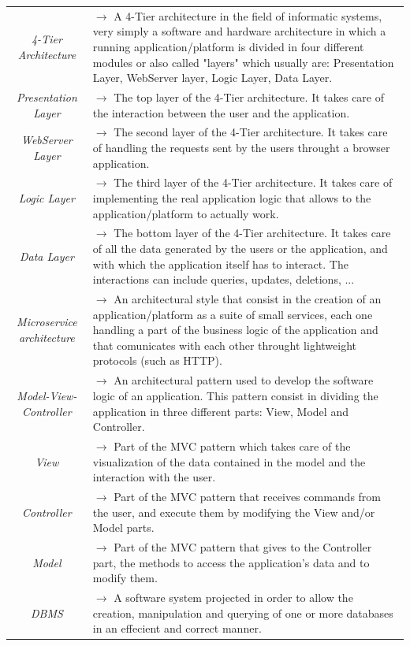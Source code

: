 \documentclass{article}
\begin{document}
{\begin{xltabular}{\textwidth}{ >{\raggedright\arraybackslash}c >{\raggedright\arraybackslash}X }
    \textit{4-Tier Architecture} & $\rightarrow$ A 4-Tier architecture in the field of informatic systems, very simply
    a software and hardware architecture in which a running application/platform is divided in four different modules
    or also called "layers" which usually are: Presentation Layer, WebServer layer, Logic Layer, Data Layer. \\
    \textit{Presentation Layer} & $\rightarrow$ The top layer of the 4-Tier architecture. It takes care of the interaction
    between the user and the application.\\
    \textit{WebServer Layer} & $\rightarrow$ The second layer of the 4-Tier architecture. It takes care of handling the requests
    sent by the users throught a browser application. \\
    \textit{Logic Layer} & $\rightarrow$ The third layer of the 4-Tier architecture. It takes care of implementing the real
    application logic that allows to the application/platform to actually work. \\
    \textit{Data Layer} & $\rightarrow$ The bottom layer of the 4-Tier architecture. It takes care of all the data generated
    by the users or the application, and with which the application itself has to interact. The interactions
    can include queries, updates, deletions, ... \\
    \textit{Microservice architecture} & $\rightarrow$ An architectural style that consist in the creation of an
    application/platform as a suite of small services, each one handling a part of the business logic of the application
    and that comunicates with each other throught lightweight protocols (such as HTTP). \\
    \textit{Model-View-Controller} & $\rightarrow$ An architectural pattern used to develop the
    software logic of an application. This pattern consist in dividing the application in three
    different parts: View, Model and Controller. \\
    \textit{View} & $\rightarrow$ Part of the MVC pattern which takes care of the visualization of the
    data contained in the model and the interaction with the user. \\
    \textit{Controller} & $\rightarrow$ Part of the MVC pattern that receives commands from the user, and execute them
    by modifying the View and/or Model parts. \\
    \textit{Model} & $\rightarrow$ Part of the MVC pattern that gives to the Controller part, the
    methods to access the application's data and to modify them. \\
    \textit{DBMS} & $\rightarrow$ A software system projected in order to allow the creation,
    manipulation and querying of one or more databases in an effecient and correct manner.
\end{xltabular}

}
\end{document}

